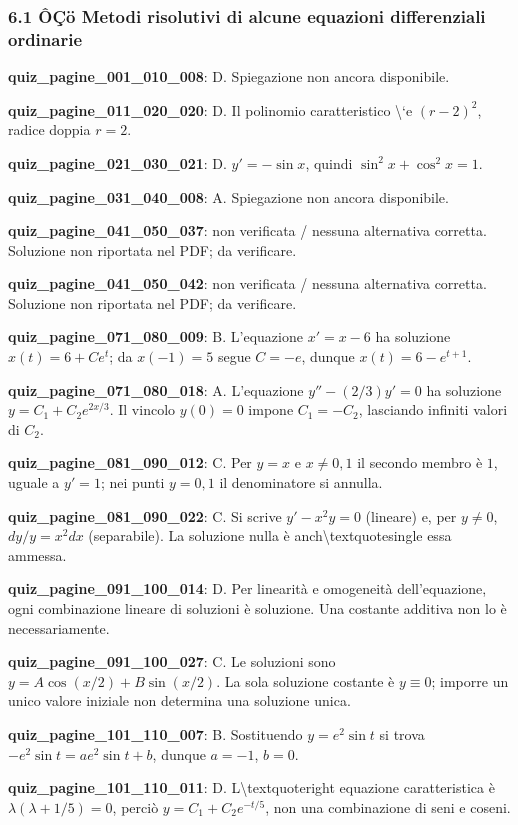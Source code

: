 \documentclass[11pt,a4paper]{article}
\newcounter{quiz}
\begin{document}
\subsubsection*{6.1 ÔÇö Metodi risolutivi di alcune equazioni differenziali ordinarie}
\noindent\textbf{quiz\_pagine\_001\_010\_008}: D. Spiegazione non ancora disponibile.\par\medskip
\noindent\textbf{quiz\_pagine\_011\_020\_020}: D. Il polinomio caratteristico \textbackslash{}`e $(r-2)^2$, radice doppia $r=2$.\par\medskip
\noindent\textbf{quiz\_pagine\_021\_030\_021}: D. $y\prime=-\sin x$, quindi $\sin^2x+\cos^2x=1$.\par\medskip
\noindent\textbf{quiz\_pagine\_031\_040\_008}: A. Spiegazione non ancora disponibile.\par\medskip
\noindent\textbf{quiz\_pagine\_041\_050\_037}: non verificata / nessuna alternativa corretta. Soluzione non riportata nel PDF; da verificare.\par\medskip
\noindent\textbf{quiz\_pagine\_041\_050\_042}: non verificata / nessuna alternativa corretta. Soluzione non riportata nel PDF; da verificare.\par\medskip
\noindent\textbf{quiz\_pagine\_071\_080\_009}: B. L'equazione $x'=x-6$ ha soluzione $x(t)=6+Ce^t$; da $x(-1)=5$ segue $C=-e$, dunque $x(t)=6-e^{t+1}$.\par\medskip
\noindent\textbf{quiz\_pagine\_071\_080\_018}: A. L'equazione $y''-(2/3)y'=0$ ha soluzione $y=C_1+C_2e^{2x/3}$. Il vincolo $y(0)=0$ impone $C_1=-C_2$, lasciando infiniti valori di $C_2$.\par\medskip
\noindent\textbf{quiz\_pagine\_081\_090\_012}: C. Per $y=x$ e $x\neq0,1$ il secondo membro è $1$, uguale a $y\prime=1$; nei punti $y=0,1$ il denominatore si annulla.\par\medskip
\noindent\textbf{quiz\_pagine\_081\_090\_022}: C. Si scrive $y\prime-x^2y=0$ (lineare) e, per $y\neq0$, $dy/y=x^2dx$ (separabile). La soluzione nulla è anch\textbackslash{}textquotesingle essa ammessa.\par\medskip
\noindent\textbf{quiz\_pagine\_091\_100\_014}: D. Per linearità e omogeneità dell'equazione, ogni combinazione lineare di soluzioni è soluzione. Una costante additiva non lo è necessariamente.\par\medskip
\noindent\textbf{quiz\_pagine\_091\_100\_027}: C. Le soluzioni sono $y=A\cos(x/2)+B\sin(x/2)$. La sola soluzione costante è $y\equiv0$; imporre un unico valore iniziale non determina una soluzione unica.\par\medskip
\noindent\textbf{quiz\_pagine\_101\_110\_007}: B. Sostituendo $y=e^2\sin t$ si trova $-e^2\sin t=ae^2\sin t+b$, dunque $a=-1$, $b=0$.\par\medskip
\noindent\textbf{quiz\_pagine\_101\_110\_011}: D. L\textbackslash{}textquoteright equazione caratteristica è $\lambda(\lambda+1/5)=0$, perciò $y=C_1+C_2e^{-t/5}$, non una combinazione di seni e coseni.\par\medskip
\end{document}
